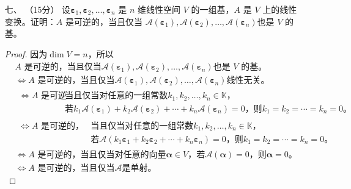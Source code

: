 \begin{enumerate}[1~]
\item[七、]（15分）
设$\boldsymbol{\varepsilon} _ { 1 } , \boldsymbol{\varepsilon} _ { 2 } , \dots , \boldsymbol{\varepsilon} _ { n }$ 是 $n$ 维线性空间 $V$ 的一组基，$A$ 是 $V$ 上的线性变换。证明：$A$ 是可逆的，当且仅当
$\mathscr { A } \left( \boldsymbol{\varepsilon} _ { 1 } \right) , \mathscr { A } \left( \boldsymbol{\varepsilon} _ { 2 } \right) , \dots , \mathscr { A } \left( \boldsymbol{\varepsilon} _ { n } \right)$也是 $V$ 的基。
\begin{proof}
因为$\dim V=n$，所以
\begin{align*}
&\text{$A$ 是可逆的，当且仅当$\mathscr { A } \left( \boldsymbol{\varepsilon} _ { 1 } \right) , \mathscr { A } \left( \boldsymbol{\varepsilon} _ { 2 } \right) , \dots , \mathscr { A } \left( \boldsymbol{\varepsilon} _ { n } \right)$也是 $V$ 的基。}\\
&\Longleftrightarrow \text{$A$ 是可逆的，当且仅当$\mathscr { A } \left( \boldsymbol{\varepsilon} _ { 1 } \right) , \mathscr { A } \left( \boldsymbol{\varepsilon} _ { 2 } \right) , \dots , \mathscr { A } \left( \boldsymbol{\varepsilon} _ { n } \right)$线性无关。}\\
&\begin{aligned}\Longleftrightarrow \text{$A$ 是可逆的，}&\text{当且仅当对任意的一组常数$k_1, k_2, \dots, k_n\in \mathbb{K}$，}\\
&\text{若$k_1\mathscr { A } \left( \boldsymbol{\varepsilon} _ { 1 } \right) +k_2 \mathscr { A } \left( \boldsymbol{\varepsilon} _ { 2 } \right) + \cdots +k_n \mathscr { A } \left( \boldsymbol{\varepsilon} _ { n } \right)=0$，则$k_1=k_2=\cdots=k_n=0$。}
\end{aligned}\\
&\begin{aligned}\Longleftrightarrow \text{$A$ 是可逆的，}
&\text{当且仅当对任意的一组常数$k_1, k_2, \dots, k_n\in \mathbb{K}$，}\\
&\text{若$\mathscr { A } \left(k_1 \boldsymbol{\varepsilon} _ { 1 }  +k_2  \boldsymbol{\varepsilon} _ { 2 }  + \cdots +k_n \boldsymbol{\varepsilon} _ { n } \right)=0$，则$k_1=k_2=\cdots=k_n=0$。}
\end{aligned}\\
&\Longleftrightarrow \text{$A$ 是可逆的，当且仅当对任意的向量$\boldsymbol{\alpha}\in V$，若$\mathscr { A } \left(\boldsymbol{\alpha} \right)=0$，则$\boldsymbol{\alpha}=0$。}\\
&\Longleftrightarrow \text{$A$ 是可逆的，当且仅当$\mathscr{A}$是单射。}
\end{align*}

\end{proof}
\end{enumerate}

